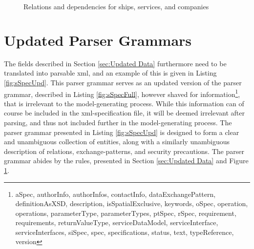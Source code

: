 \begin{figure}
	\caption{Relations and dependencies for ships, services, and companies}
	\label{fig:entities}
\end{figure}


\section{Updated Parser Grammars}

The fields described in Section \ref{sec:Updated Data} furthermore need to be translated into parsable xml, and an example of this is given in Listing \ref{fig:sSpecUpd}. This parser grammar serves as an updated version of the parser grammar, described in Listing \ref{fig:sSpecFull}, however shaved for information\footnote{aSpec, authorInfo, authorInfos, contactInfo, dataExchangePattern, definitionAsXSD, description, isSpatialExclusive, keywords, oSpec, operation, operations, parameterType, parameterTypes, ptSpec, rSpec, requirement, requirements, returnValueType, serviceDataModel, serviceInterface, serviceInterfaces, siSpec, spec, specifications, status, text, typeReference, version}, that is irrelevant to the model-generating process. While this information can of course be included in the xml-specification file, it will be deemed irrelevant after parsing, and thus not included further in the model-generating process. The parser grammar presented in Listing \ref{fig:sSpecUpd} is designed to form a clear and unambiguous collection of entities, along with a similarly unambiguous description of relations, exchange-patterns, and security precautions. The parser grammar abides by the rules, presented in Section \ref{sec:Updated Data} and Figure \ref{fig:entities}.

